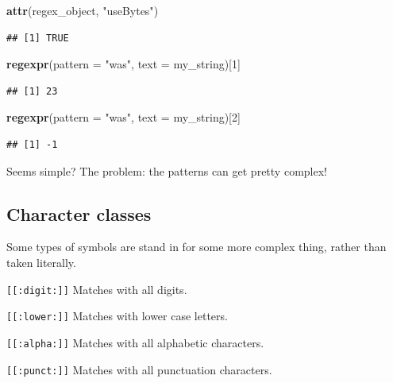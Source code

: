 \documentclass[]{book}
\newenvironment{Shaded}{\begin{snugshade}}{\end{snugshade}}
\newcommand{\DataTypeTok}[1]{\textcolor[rgb]{0.13,0.29,0.53}{#1}}
\newcommand{\DecValTok}[1]{\textcolor[rgb]{0.00,0.00,0.81}{#1}}
\newcommand{\KeywordTok}[1]{\textcolor[rgb]{0.13,0.29,0.53}{\textbf{#1}}}
\newcommand{\NormalTok}[1]{#1}
\newcommand{\StringTok}[1]{\textcolor[rgb]{0.31,0.60,0.02}{#1}}
\theoremstyle{definition}
\theoremstyle{definition}
\theoremstyle{definition}
\theoremstyle{remark}
\begin{document}
\begin{Shaded}
\begin{Highlighting}[]
\KeywordTok{attr}\NormalTok{(regex_object, }\StringTok{"useBytes"}\NormalTok{)}
\end{Highlighting}
\end{Shaded}

\begin{verbatim}
## [1] TRUE
\end{verbatim}

\begin{Shaded}
\begin{Highlighting}[]
\KeywordTok{regexpr}\NormalTok{(}\DataTypeTok{pattern =} \StringTok{"was"}\NormalTok{, }\DataTypeTok{text =}\NormalTok{ my_string)[}\DecValTok{1}\NormalTok{]}
\end{Highlighting}
\end{Shaded}

\begin{verbatim}
## [1] 23
\end{verbatim}

\begin{Shaded}
\begin{Highlighting}[]
\KeywordTok{regexpr}\NormalTok{(}\DataTypeTok{pattern =} \StringTok{"was"}\NormalTok{, }\DataTypeTok{text =}\NormalTok{ my_string)[}\DecValTok{2}\NormalTok{]}
\end{Highlighting}
\end{Shaded}

\begin{verbatim}
## [1] -1
\end{verbatim}

Seems simple? The problem: the patterns can get pretty complex!

\hypertarget{character-classes}{%
\subsection{Character classes}\label{character-classes}}

Some types of symbols are stand in for some more complex thing, rather than taken literally.

\texttt{{[}{[}:digit:{]}{]}} Matches with all digits.

\texttt{{[}{[}:lower:{]}{]}} Matches with lower case letters.

\texttt{{[}{[}:alpha:{]}{]}} Matches with all alphabetic characters.

\texttt{{[}{[}:punct:{]}{]}} Matches with all punctuation characters.
\end{document}
